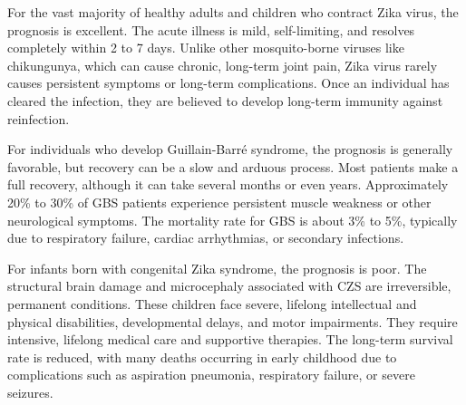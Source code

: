 For the vast majority of healthy adults and children who contract Zika virus, the prognosis is excellent. The acute illness is mild, self-limiting, and resolves completely within 2 to 7 days. Unlike other mosquito-borne viruses like chikungunya, which can cause chronic, long-term joint pain, Zika virus rarely causes persistent symptoms or long-term complications. Once an individual has cleared the infection, they are believed to develop long-term immunity against reinfection.

For individuals who develop Guillain-Barr\'e syndrome, the prognosis is generally favorable, but recovery can be a slow and arduous process. Most patients make a full recovery, although it can take several months or even years. Approximately 20\% to 30\% of GBS patients experience persistent muscle weakness or other neurological symptoms. The mortality rate for GBS is about 3\% to 5\%, typically due to respiratory failure, cardiac arrhythmias, or secondary infections.

For infants born with congenital Zika syndrome, the prognosis is poor. The structural brain damage and microcephaly associated with CZS are irreversible, permanent conditions. These children face severe, lifelong intellectual and physical disabilities, developmental delays, and motor impairments. They require intensive, lifelong medical care and supportive therapies. The long-term survival rate is reduced, with many deaths occurring in early childhood due to complications such as aspiration pneumonia, respiratory failure, or severe seizures.

